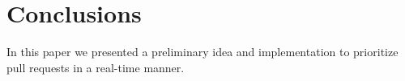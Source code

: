 \section{Conclusions}
\label{sec:conclusions}

In this paper we presented a preliminary idea and implementation to prioritize pull requests in a real-time manner.
